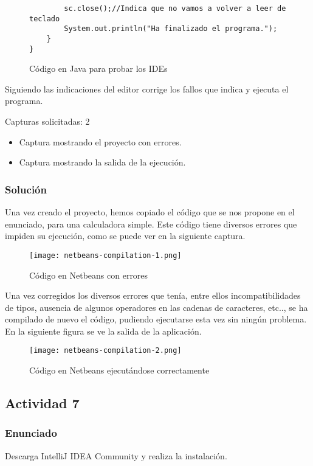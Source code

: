 \begin{figure}[H]
\begin{tcolorbox}[sharp corners, colback=yellow!30, colframe=white!20]
\begin{verbatim}
        sc.close();//Indica que no vamos a volver a leer de teclado
        System.out.println("Ha finalizado el programa.");
    }
}         \end{verbatim}
    \end{tcolorbox}
    \caption{Código en Java para probar los IDEs}
\end{figure}

Siguiendo las indicaciones del editor corrige los fallos que indica y ejecuta el programa.

Capturas solicitadas: 2
\begin{itemize}
    \item Captura mostrando el proyecto con errores.
    \item Captura mostrando la salida de la ejecución.
\end{itemize}

\vspace{2ex}

\subsubsection{Solución}
Una vez creado el proyecto, hemos copiado el código que se nos propone en el enunciado, para una calculadora simple. Este código tiene diversos errores que impiden su ejecución, como se puede ver en la siguiente captura.

\begin{figure}[ht]
    \centering
    \texttt{[image: netbeans-compilation-1.png]}
    \caption{Código en Netbeans con errores}
\end{figure}

Una vez corregidos los diversos errores que tenía, entre ellos incompatibilidades de tipos, ausencia de algunos operadores en las cadenas de caracteres, etc.., se ha compilado de nuevo el código, pudiendo ejecutarse esta vez sin ningún problema. En la siguiente figura se ve la salida de la aplicación.

\begin{figure}[ht]
    \centering
    \texttt{[image: netbeans-compilation-2.png]}
    \caption{Código en Netbeans ejecutándose correctamente}
\end{figure}

\subsection{Actividad 7}
\subsubsection{Enunciado}
Descarga IntelliJ IDEA Community y realiza la instalación.

